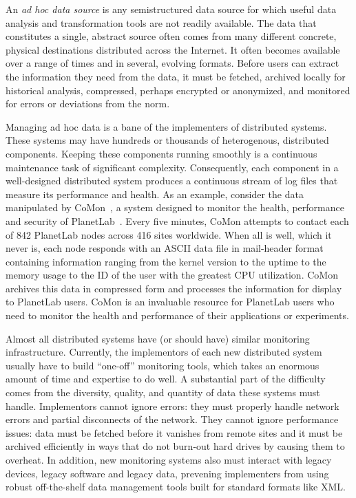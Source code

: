 

An {\em ad hoc data source} is any semistructured data source for
which useful data analysis and transformation tools are not readily
available.  The data that constitutes a single, abstract source 
often comes from many different concrete, physical destinations
distributed across the Internet.  It often becomes available
over a range of times and in several, evolving formats.
Before users can extract the information they need from the data,
it must be fetched, archived locally for historical analysis, 
compressed, perhaps encrypted or anonymized, and monitored for errors 
or deviations from the norm.

Managing ad hoc data is a bane of the implementers of distributed
systems.  These systems may have hundreds or thousands of
heterogenous, distributed components.  Keeping these components
running smoothly is a continuous maintenance task of significant
complexity.  Consequently, each component in a well-designed
distributed system produces a continuous stream of log files that
measure its performance and health.  As an example, consider the data
manipulated by CoMon~\cite{comon}, a system designed to monitor the
health, performance and security of PlanetLab~\cite{planetlab}.  Every
five minutes, CoMon attempts to contact each of 842 PlanetLab nodes
across 416 sites worldwide.%
% 
When all is well, which it never is, each node responds with
an ASCII data file in mail-header format containing information
ranging from the kernel version to the uptime to the memory usage to
the ID of the user with the greatest CPU utilization.  CoMon archives
this data in compressed form and processes the information
for display to PlanetLab users.  CoMon is an invaluable resource for
PlanetLab users who need to monitor the health and performance of their
applications or experiments.

Almost all distributed systems have (or should have) similar
monitoring infrastructure.  Currently, the implementors of each new
distributed system usually have to build ``one-off'' monitoring tools,
which takes an enormous amount of time and expertise to do well.  A
substantial part of the difficulty comes from the diversity, quality,
and quantity of data these systems must handle.  Implementors cannot
ignore errors: they must properly handle network errors and partial
disconnects of the network.  They cannot ignore performance issues:
data must be fetched before it vanishes from remote sites and it must
be archived efficiently in ways that do not burn-out hard drives by
causing them to overheat.  In addition, new monitoring systems also
must interact with legacy devices, legacy software and legacy data,
prevening implementers from using robust off-the-shelf data management
tools built for standard formats like XML. 

